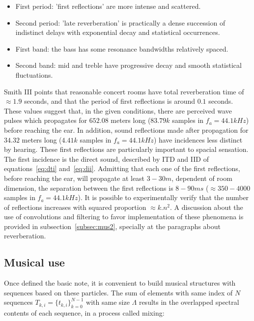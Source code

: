 \documentclass[
 aip,
 jmp,
 amsmath,amssymb,
 reprint,
]{revtex4-1}
\begin{document}
\begin{itemize}
   \item First period: 'first reflections' are more intense and scattered.
   \item Second period: 'late reverberation' is practically a dense succession of indistinct delays with exponential decay and statistical occurrences.
   \item First band: the bass has some resonance bandwidths relatively spaced.
   \item Second band: mid and treble have progressive decay and smooth statistical fluctuations.
\end{itemize}

Smith III points that reasonable concert rooms have total reverberation time of  $\approx 1.9$ seconds, and that the period of first reflections is around $0.1$ seconds. These values suggest that, in the given conditions, there are perceived wave pulses which propagates for $652.08$ meters long ($83.79k$ samples in $f_a=44.1kHz$) before reaching the ear. In addition, sound reflections made after propagation for $34.32$ meters long ($4.41k$ samples in $f_a=44.1kHz$) have incidences less distinct by hearing. These first reflections are particularly important to spacial sensation. The first incidence is the direct sound, described by ITD and IID of equations~\ref{eq:dti} and~\ref{eq:dii}. Admitting that each one of the first reflections, before reaching the ear, will propagate at least $3-30m$, dependent of room dimension, the separation between the first reflections is $8-90ms$ ($\approx 350-4000$ samples in $f_a=44.1kHz$). It is possible to experimentally verify that the number of reflections increases with squared proportion $\approx k.n^2$. A discussion about the use of convolutions and filtering to favor implementation of these phenomena is provided in subsection~\ref{subsec:mus2}, specially at the paragraphs about reverberation.

\subsection{Musical use}\label{subsec:basMus}

Once defined the basic note, it is convenient to build musical structures with sequences based on these particles. The sum of elements with same index of $N$ sequences $T_{k,i}=\{t_{k,i}\}_{k=0}^{N-1}$ with same size $\Lambda$ results in the overlapped spectral contents of each sequence, in a process called mixing:
\end{document}
